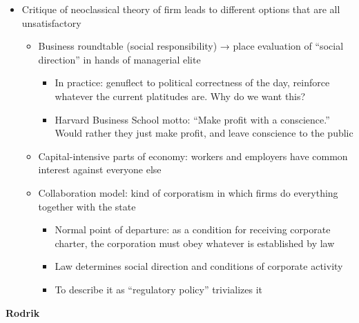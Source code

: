 \begin{itemize}
\tightlist
\item
  Critique of neoclassical theory of firm leads to different options
  that are all unsatisfactory

  \begin{itemize}
  \tightlist
  \item
    Business roundtable (social responsibility) → place evaluation of
    ``social direction'' in hands of managerial elite

    \begin{itemize}
    \tightlist
    \item
      In practice: genuflect to political correctness of the day,
      reinforce whatever the current platitudes are. Why do we want
      this?
    \item
      Harvard Business School motto: ``Make profit with a conscience.''
      Would rather they just make profit, and leave conscience to the
      public
    \end{itemize}
  \item
    Capital-intensive parts of economy: workers and employers have
    common interest against everyone else
  \item
    Collaboration model: kind of corporatism in which firms do
    everything together with the state

    \begin{itemize}
    \tightlist
    \item
      Normal point of departure: as a condition for receiving corporate
      charter, the corporation must obey whatever is established by law
    \item
      Law determines social direction and conditions of corporate
      activity
    \item
      To describe it as ``regulatory policy'' trivializes it
    \end{itemize}
  \end{itemize}
\end{itemize}

\textbf{Rodrik}

